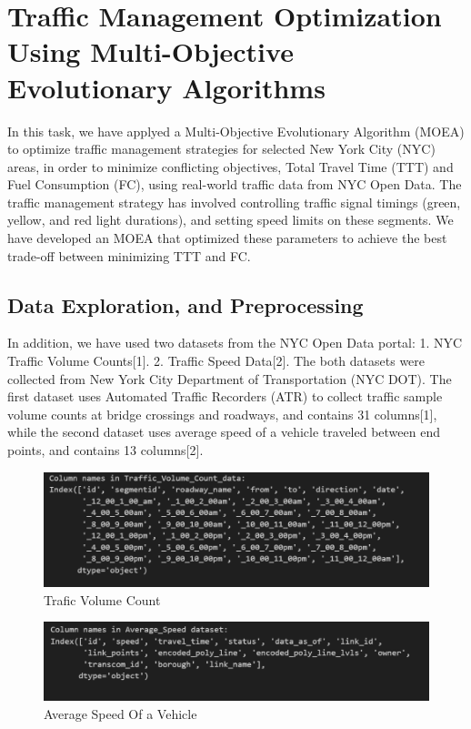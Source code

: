 \section{Traffic Management Optimization Using Multi-Objective Evolutionary Algorithms}

In this task, we have applyed a Multi-Objective Evolutionary Algorithm (MOEA) to optimize traffic management strategies for selected New York City (NYC) areas, in order to  minimize conflicting
objectives, Total Travel Time (TTT) and Fuel Consumption (FC), using real-world traffic data
from NYC Open Data. 
\newline
\newline
The traffic management strategy has involved controlling traffic signal timings (green, yellow, and red light durations), and setting speed limits on these segments. We have developed an MOEA that optimized these parameters to achieve the best trade-off between minimizing TTT and FC.

\subsection{Data Exploration, and Preprocessing}

In addition, we have used two datasets from the NYC Open Data portal:
1. NYC Traffic Volume Counts[1].
2. Traffic Speed Data[2].
\newline
\newline
The both datasets were collected from New York City Department of Transportation (NYC DOT). The first dataset uses Automated Traffic Recorders (ATR) to collect traffic sample volume counts at bridge crossings and roadways, and contains 31 columns[1], while the second dataset uses average speed of a vehicle traveled between end points, and contains 13 columns[2].
\newline
\newline
\begin{figure}[h]
    \centering
    \includegraphics[width=1\linewidth]{figures/trafic_volume_count.PNG}
    \caption{Trafic Volume Count}
    \label{fig:Trafic Volume Count}
\end{figure}
\newline
\begin{figure}[h]
    \centering
    \includegraphics[width=1\linewidth]{figures/average_speed_dataset.PNG}
    \caption{Average Speed Of a Vehicle}
    \label{fig:Average Speed Of a Vehicle}
\end{figure}

